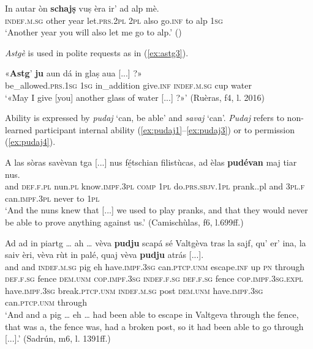 \ea
\label{ex:astg2}
\gll  In autar òn \textbf{schajṣ} vuṣ èra ir' ad alp mè.\\
\textsc{indef.m.sg} other year let.\textsc{prs.2pl} \textsc{2pl} also go.\textsc{inf} to alp \textsc{1sg}\\
\glt `Another year you will also let me go to alp.' (\citealt[85]{Gadola1935})
\z

\textit{Astgè} is used in polite requests as in  (\ref{ex:astg3}).

\ea
\label{ex:astg3}
	\gll  «\textbf{Astg}’ \textbf{ju} aun dá in glaṣ aua [...] ?»\\
be\_allowed.\textsc{prs.1sg} \textsc{1sg} in\_addition give.\textsc{inf} \textsc{indef.m.sg} cup water\\
\glt `«May I give [you] another glass of water [...] ?»' (Ruèras, f4, l. 2016)
\z

Ability is expressed by \textit{pudaj} `can, be able' and \textit{savaj} `can'. \textit{Pudaj} refers to non-learned participant internal ability (\ref{ex:pudaj1}--\ref{ex:pudaj3}) or to permission (\ref{ex:pudaj4}).

\ea
\label{ex:pudaj1}
\gll    A las sòras savèvan tga [...] nus fé̱tschian filistùcas, ad èlas \textbf{pudévan} maj tiar nus.\\
and \textsc{def.f.pl} nun.\textsc{pl} know.\textsc{impf.3pl} \textsc{comp} {} \textsc{1pl} do.\textsc{prs.sbjv.1pl} prank.\textsc.{pl} and \textsc{3pl.f} can.\textsc{impf.3pl} never to \textsc{1pl}\\
\glt `And the nuns knew that [...] we used to play pranks, and that they would never be able to prove anything against us.' (Camischùlas, f6, l.699ff.)
\z

\ea
\label{ex:pudaj2}
\gll    Ad ad in piartg … ah … vèva \textbf{pudju} scapá sé Valtgèva tras la sajf, qu’ er’ ina, la saiv èri, vèva rùt in palé, quaj vèva \textbf{pudju} atrás [...].\\
and and \textsc{indef.m.sg} pig {} eh {}  have.\textsc{impf.3sg} can.\textsc{ptcp.unm} escape.\textsc{inf} up \textsc{pn} through \textsc{def.f.sg} fence  \textsc{dem.unm} \textsc{cop.impf.3sg}  \textsc{indef.f.sg} \textsc{def.f.sg} fence \textsc{cop.impf.3sg.expl} have.\textsc{impf.3sg} break.\textsc{ptcp.unm}  \textsc{indef.m.sg} post \textsc{dem.unm}  have.\textsc{impf.3sg} can.\textsc{ptcp.unm} through \\
\glt `And and a pig … eh … had been able to escape in Valtgeva through the fence, that was a, the fence was, had a broken post, so it had been able to go through [...].' (Sadrún, m6, l. 1391ff.)
\z

